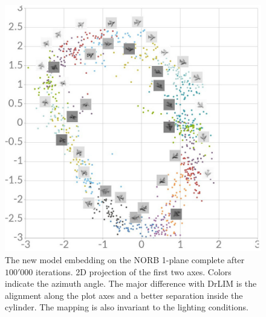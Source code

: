 \documentclass[a4paper,12pt]{report}
\begin{document}
\begin{figure}
    \centering
    \includegraphics[width=\textwidth]{thesis_figures/norb_cl2d.jpg}
    \caption{The new model embedding on the NORB 1-plane complete after $100'000$ iterations.
    2D projection of the first two axes.
    Colors indicate the azimuth angle.
    The major difference with DrLIM is the alignment along the plot axes and a better separation inside the cylinder.
    The mapping is also invariant to the lighting conditions.
    }
    \label{fig:norb_cl2d_embedding_1}
\end{figure}
\end{document}
